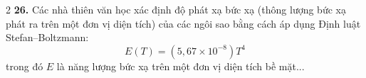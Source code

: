 \begin{multicols}{2}
\noindent\textbf{26.} Các nhà thiên văn học xác định độ phát xạ bức xạ (thông lượng bức xạ phát ra trên một đơn vị diện tích) của các ngôi sao bằng cách áp dụng Định luật Stefan--Boltzmann:
\[ E(T) = (5{,}67 \times 10^{-8})T^4 \]
trong đó $E$ là năng lượng bức xạ trên một đơn vị diện tích bề mặt...

\end{multicols}